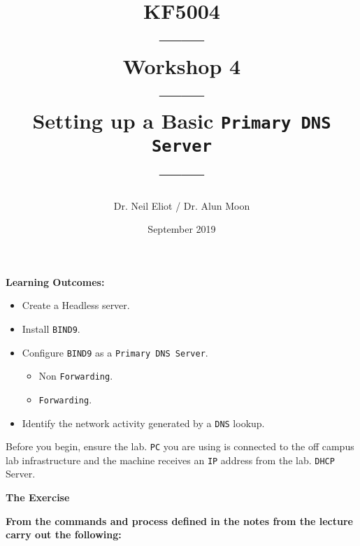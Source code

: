 \documentclass[11pt]{article}
\begin{document}
\author{Dr. Neil Eliot / Dr. Alun Moon}
\title{KF5004\\------\\Workshop 4\\------\\Setting up a Basic \texttt{Primary DNS Server}\\------}
\date{September 2019}
\maketitle

\newpage



\noindent\textbf{Learning Outcomes:}
\begin{itemize}
    \item Create a Headless server.
    \item Install \texttt{BIND9}.
    \item Configure \texttt{BIND9} as a \texttt{Primary DNS Server}.
        \begin{itemize} 
            \item Non \texttt{Forwarding}.
            \item \texttt{Forwarding}.
        \end{itemize} 
    \item Identify the network activity generated by a \texttt{DNS} lookup.
\end{itemize}


\begin{tcolorbox}[title={\textbf{Important:}}]
    Before you begin, ensure the lab. \texttt{PC} you are using is connected to the off campus lab infrastructure and the machine receives an \texttt{IP} address from the lab. \texttt{DHCP} Server.
\end{tcolorbox}
\newpage

\noindent\textbf{The Exercise}\\
\begin{tcolorbox}[colback=blue!20]
    \noindent\textbf{From the commands and process defined in the notes from the lecture carry out the following:}
\end{tcolorbox}
\end{document}
